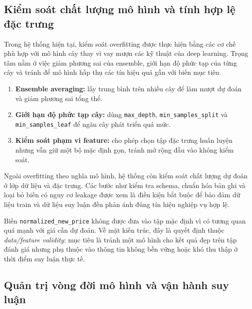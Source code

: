 \subsection{Kiểm soát chất lượng mô hình và tính hợp lệ đặc trưng}


Trong hệ thống hiện tại, kiểm soát overfitting được thực hiện bằng các cơ chế phù hợp với mô hình cây thay vì vay mượn các kỹ thuật của deep learning. Trọng tâm nằm ở việc giảm phương sai của ensemble, giới hạn độ phức tạp của từng cây và tránh để mô hình hấp thụ các tín hiệu quá gần với biến mục tiêu.

\begin{enumerate}[label=\arabic*.]
    \item \textbf{Ensemble averaging:} lấy trung bình trên nhiều cây để làm mượt dự đoán và giảm phương sai tổng thể.
    \item \textbf{Giới hạn độ phức tạp cây:} dùng \texttt{max\_depth}, \texttt{min\_samples\_split} và \texttt{min\_samples\_leaf} để ngăn cây phát triển quá mức.
    \item \textbf{Kiểm soát phạm vi feature:} cho phép chọn tập đặc trưng huấn luyện nhưng vẫn giữ một bộ mặc định gọn, tránh mở rộng đầu vào không kiểm soát.
\end{enumerate}


Ngoài overfitting theo nghĩa mô hình, hệ thống còn kiểm soát chất lượng dự đoán ở lớp dữ liệu và đặc trưng. Các bước như kiểm tra schema, chuẩn hóa bản ghi và loại bỏ biến có nguy cơ leakage được xem là điều kiện bắt buộc để bảo đảm dữ liệu train và dữ liệu suy luận đều phản ánh đúng tín hiệu nghiệp vụ hợp lệ.


Biến \texttt{normalized\_new\_price} không được đưa vào tập mặc định vì có tương quan quá mạnh với giá cần dự đoán. Về mặt kiến trúc, đây là quyết định thuộc \textit{data/feature validity}: mục tiêu là tránh một mô hình cho kết quả đẹp trên tập đánh giá nhưng phụ thuộc vào thông tin không bền vững hoặc khó thu thập ở thời điểm suy luận thực tế.

\subsection{Quản trị vòng đời mô hình và vận hành suy luận}


